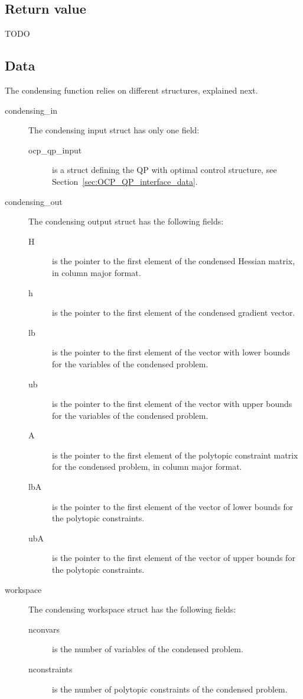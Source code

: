\documentclass{report}
\begin{document}
\subsection{Return value}
TODO

\subsection{Data}
The condensing function relies on different structures, explained next.
\begin{description}
	\item[condensing\_in] The condensing input struct has only one field:
	\begin{description}
		\item[ocp\_qp\_input] is a struct defining the QP with optimal control structure, see Section~\ref{sec:OCP_QP_interface_data}.
	\end{description}
	\item[condensing\_out] The condensing output struct has the following fields:
	\begin{description}
		\item[H] is the pointer to the first element of the condensed Hessian matrix, in column major format.
		\item[h] is the pointer to the first element of the condensed gradient vector.
		\item[lb] is the pointer to the first element of the vector with lower bounds for the variables of the condensed problem.
		\item[ub] is the pointer to the first element of the vector with upper bounds for the variables of the condensed problem.
		\item[A] is the pointer to the first element of the polytopic constraint matrix for the condensed problem, in column major format.
		\item[lbA] is the pointer to the first element of the vector of lower bounds for the polytopic constraints.
		\item[ubA] is the pointer to the first element of the vector of upper bounds for the polytopic constraints.
	\end{description}
	\item[workspace] The condensing workspace struct has the following fields:
	\begin{description}
		\item[nconvars] is the number of variables of the condensed problem.
		\item[nconstraints] is the number of polytopic constraints of the condensed problem.

\end{description}
\end{description}
\end{document}
